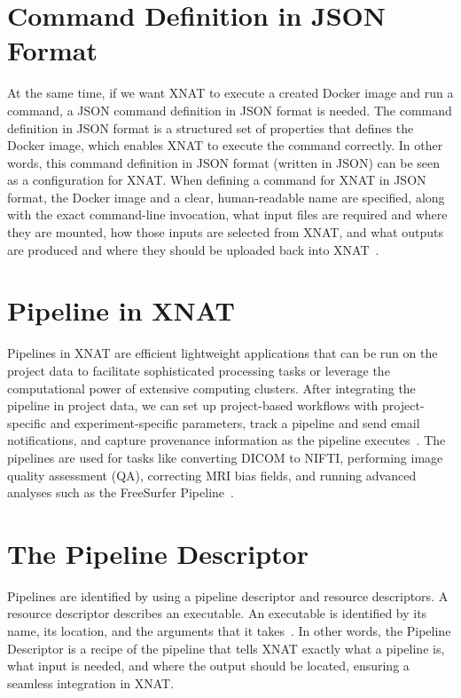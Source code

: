 \section{Command Definition in JSON Format}
At the same time, if we want XNAT to execute a created Docker image and run a command, a \ac{JSON} command definition in JSON format is needed. The command definition in JSON format is a structured set of properties that defines the Docker image, which enables XNAT to execute the command correctly. In other words, this command definition in JSON format (written in JSON) can be seen as a configuration for XNAT. When defining a command for XNAT in JSON format, the Docker image and a clear, human-readable name are specified, along with the exact command-line invocation, what input files are required and where they are mounted, how those inputs are selected from XNAT, and what outputs are produced and where they should be uploaded back into XNAT~\cite{JSONCommand}.

\section{Pipeline in XNAT}
Pipelines in XNAT are efficient lightweight applications that can be run on the project data to facilitate sophisticated processing tasks or leverage the computational power of extensive computing clusters. After integrating the pipeline in project data, we can set up project-based workflows with project-specific and experiment-specific parameters, track a pipeline and send email notifications, and capture provenance information as the pipeline executes~\cite{Pipeline}. The pipelines are used for tasks like converting DICOM to NIFTI, performing image quality assessment (QA), correcting MRI bias fields, and running advanced analyses such as the FreeSurfer Pipeline~\cite{xnat-pipelines}.

\section{The Pipeline Descriptor}

Pipelines are identified by using a pipeline descriptor and resource descriptors. A resource descriptor describes an executable. An executable is identified by its name, its location, and the arguments that it takes~\cite{XNAT_Pipeline_Development_Schema}. In other words, the Pipeline Descriptor is a recipe of the pipeline that tells XNAT exactly what a pipeline is, what input is needed, and where the output should be located, ensuring a seamless integration in XNAT.








